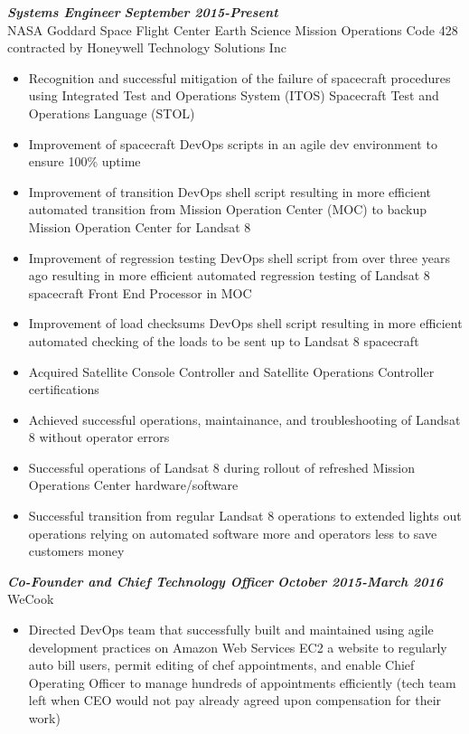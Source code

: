 \documentclass{res}
\begin{document}
\begin{resume}
	{\bfseries {\em Systems Engineer}}  \hfill  {\bfseries{\em September 2015-Present}}\\
		NASA Goddard Space Flight Center Earth Science Mission Operations Code 428\\
		contracted by Honeywell Technology Solutions Inc
                \begin{itemize}  \itemsep -2pt %
		\item Recognition and successful mitigation of the failure of spacecraft procedures using Integrated Test and Operations System (ITOS) Spacecraft Test and Operations Language (STOL)
		\item Improvement of spacecraft DevOps scripts in an agile dev environment to ensure 100\% uptime
		\item Improvement of transition DevOps shell script resulting in more efficient automated transition from Mission Operation Center (MOC) to backup Mission Operation Center for Landsat 8
		\item Improvement of regression testing DevOps shell script from over three years ago resulting in more efficient automated regression testing of Landsat 8 spacecraft Front End Processor in MOC
		\item Improvement of load checksums  DevOps shell script resulting in more efficient automated checking of the loads to be sent up to Landsat 8 spacecraft
		\item Acquired Satellite Console Controller and Satellite Operations Controller certifications
		\item Achieved successful operations, maintainance, and troubleshooting of Landsat 8 without operator errors
		\item Successful operations of Landsat 8 during rollout of refreshed Mission Operations Center hardware/software
		\item Successful transition from regular Landsat 8 operations to extended lights out operations relying on automated software more and operators less to save customers money
                \end{itemize}
	{\bfseries {\em Co-Founder and Chief Technology Officer}}  \hfill  {\bfseries{\em October 2015-March 2016}}\\
		WeCook
                \begin{itemize}  \itemsep -2pt %
		\item Directed DevOps team that successfully built and maintained using agile development practices on Amazon Web Services EC2 a website to regularly auto bill users, permit editing of chef appointments, and enable Chief Operating Officer to manage hundreds of appointments efficiently (tech team left when CEO would not pay already agreed upon compensation for their work)

\end{itemize}
\end{resume}
\end{document}
